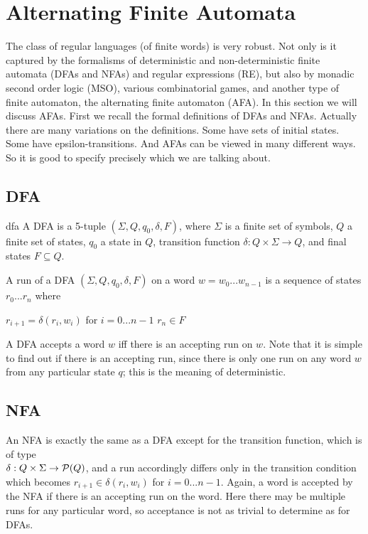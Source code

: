 
\section {Alternating Finite Automata}

The class of regular languages (of finite words) is very robust. Not only is it captured by the formalisms of deterministic and non-deterministic finite automata (DFAs and NFAs) and regular expressions (RE), but also by monadic second order logic (MSO), various combinatorial games, and another type of finite automaton, the alternating finite automaton (AFA). In this section we will discuss AFAs.
First we recall the formal definitions of DFAs and NFAs. Actually there are many variations on the definitions. Some have sets of initial states. Some have epsilon-transitions. And AFAs can be viewed in many different ways. So it is good to specify precisely which we are talking about.

\break

\subsection{DFA}

\begin{defnL}{dfa}
    A DFA is a 5-tuple $(\Sigma, Q, q_0, \delta, F)$, where $\Sigma$ is a finite set of symbols, $Q$ a finite set of states, $q_0$ a state in $Q$, transition function $\delta: Q \times \Sigma \to Q$, and final states $F \subseteq Q$.
\end{defnL}

A run of a DFA $(\Sigma, Q, q_0, \delta, F)$ on a word $w=w_0...w_{n-1}$ is a sequence of states $r_0...r_n$ where

       { $r_{i+1} = \delta(r_i, w_i)$ for $i=0...n-1$}
       {$r_n \in F$}

A DFA accepts a word $w$ iff there is an accepting run on $w$. Note that it is simple to find out if there is an accepting run, since there is only one run on any word $w$ from any particular state $q$; this is the meaning of deterministic.

\subsection{NFA}
An NFA is exactly the same as a DFA except for the transition function, which is of type \\ $\delta: Q \times \Sigma \to \mathcal{P}(Q)$, and a run accordingly differs only in the transition condition which becomes $r_{i+1} \in \delta(r_i, w_i)$ for $i=0...n-1$. Again, a word is accepted by the NFA if there is an accepting run on the word. Here there may be multiple runs for any particular word, so acceptance is not as trivial to determine as for DFAs.

